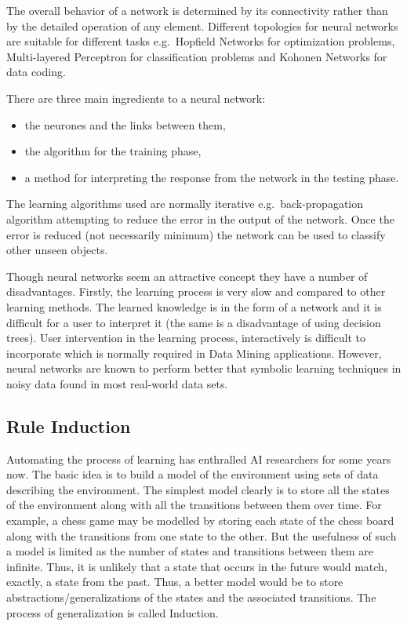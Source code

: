 \documentclass[a4paper,12pt,notitlepage,pdftex]{scrreprt}
\begin{document}
            The overall behavior of a network is determined by its connectivity rather than by the detailed operation
            of any element.
            Different topologies for neural networks are suitable for different tasks e.g.\ Hopfield Networks for
            optimization problems, Multi-layered Perceptron for classification problems and Kohonen Networks for data
            coding.

            There are three main ingredients to a neural network:
            \begin{itemize}
                \item the neurones and the links between them,
                \item the algorithm for the training phase,
                \item a method for interpreting the response from the network in the testing phase.
            \end{itemize}

            The learning algorithms used are normally iterative e.g.\ back-propagation algorithm attempting to reduce
            the error in the output of the network.
            Once the error is reduced (not necessarily minimum) the network can be used to classify other unseen
            objects.

            Though neural networks seem an attractive concept they have a number of disadvantages.
            Firstly, the learning process is very slow and compared to other learning methods.
            The learned knowledge is in the form of a network and it is difficult for a user to interpret it (the same
            is a disadvantage of using decision trees).
            User intervention in the learning process, interactively is difficult to incorporate which is normally
            required in Data Mining applications.
            However, neural networks are known to perform better that symbolic learning techniques in noisy data found
            in most real-world data sets.

        \subsection{Rule Induction}
            Automating the process of learning has enthralled AI researchers for some years now.
            The basic idea is to build a model of the environment using sets of data describing the environment.
            The simplest model clearly is to store all the states of the environment along with all the transitions
            between them over time.
            For example, a chess game may be modelled by storing each state of the chess board along with the
            transitions from one state to the other.
            But the usefulness of such a model is limited as the number of states and transitions between them are
            infinite.
            Thus, it is unlikely that a state that occurs in the future would match, exactly, a state from the past.
            Thus, a better model would be to store abstractions/generalizations of the states and the associated
            transitions.
            The process of generalization is called Induction.
\end{document}
